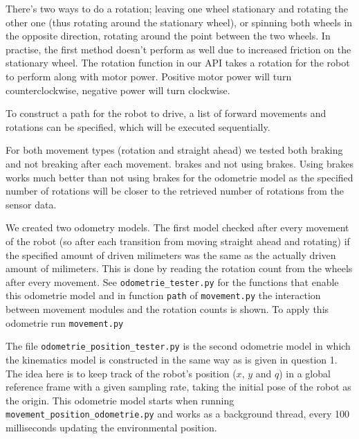 \documentclass[a4paper, 20pt]{report}
\begin{document}
\begin{enumerate}
            There's two ways to do a rotation; leaving one wheel stationary and
            rotating the other one (thus rotating around the stationary wheel),
            or spinning both wheels in the opposite direction, rotating around
            the point between the two wheels. In practise, the first method
            doesn't perform as well due to increased friction on the stationary
            wheel. The rotation function in our API takes a rotation for the
            robot to perform along with motor power. Positive motor power will
            turn counterclockwise, negative power will turn clockwise.

            To construct a path for the robot to drive, a list of forward
            movements and rotations can be specified, which will be executed
            sequentially.

            For both movement types (rotation and straight ahead) we tested both
            braking and not breaking after each movement.  brakes and not using
            brakes.  Using brakes works much better than not using brakes for
            the odometrie model as the specified number of rotations will be
            closer to the retrieved number of rotations from the sensor data.

            We created two odometry models. The first model checked after every
            movement of the robot (so after each transition from moving straight
            ahead and rotating) if the specified amount of driven milimeters was the
            same as the actually driven amount of milimeters. This is done by
            reading the rotation count from the wheels after every movement. See
            \texttt{odometrie\_tester.py} for the functions that enable this
            odometrie model and in function \texttt{path} of
            \texttt{movement.py} the interaction between movement modules and
            the rotation counts is shown. To apply this odometrie run
            \texttt{movement.py}
            
            The file \texttt{odometrie\_position\_tester.py} is the second
            odometrie model in which the kinematics model is constructed in the
            same way as is given in question 1. The idea here is to keep track
            of the robot's position ($x$, $y$ and $q$) in a global reference
            frame with a given sampling rate, taking the initial pose of the
            robot as the origin. This odometrie model starts when running
            \texttt{movement\_position\_odometrie.py} and works as a background
            thread, every 100 milliseconds updating the environmental position.


\end{enumerate}
\end{document}
